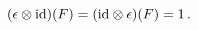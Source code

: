 \begin{equation}\label{boro2.3}
(\epsilon \otimes{\rm id})(F)=({\rm id}\otimes\epsilon )(F)=1\,.
\end{equation}

